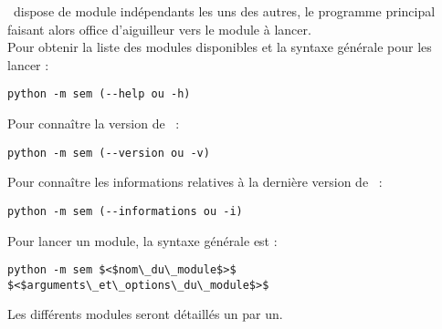 \documentclass[manual-fr.tex]{subfiles}
\begin{document}
\SEM\ dispose de module indépendants les uns des autres, le programme principal faisant alors office d'aiguilleur vers le module à lancer.\\

Pour obtenir la liste des modules disponibles et la syntaxe générale pour les lancer :

\begin{lstlisting}[style=pieceofcode,frame=single]
python -m sem (--help ou -h)
\end{lstlisting}

Pour connaître la version de \SEM\ :

\begin{lstlisting}[style=pieceofcode,frame=single]
python -m sem (--version ou -v)
\end{lstlisting}

Pour connaître les informations relatives à la dernière version de \SEM\ :

\begin{lstlisting}[style=pieceofcode,frame=single]
python -m sem (--informations ou -i)
\end{lstlisting}


Pour lancer un module, la syntaxe générale est :

\begin{lstlisting}[style=pieceofcode,frame=single]
python -m sem $<$nom\_du\_module$>$ $<$arguments\_et\_options\_du\_module$>$
\end{lstlisting}

Les différents modules seront détaillés un par un.
\end{document}
